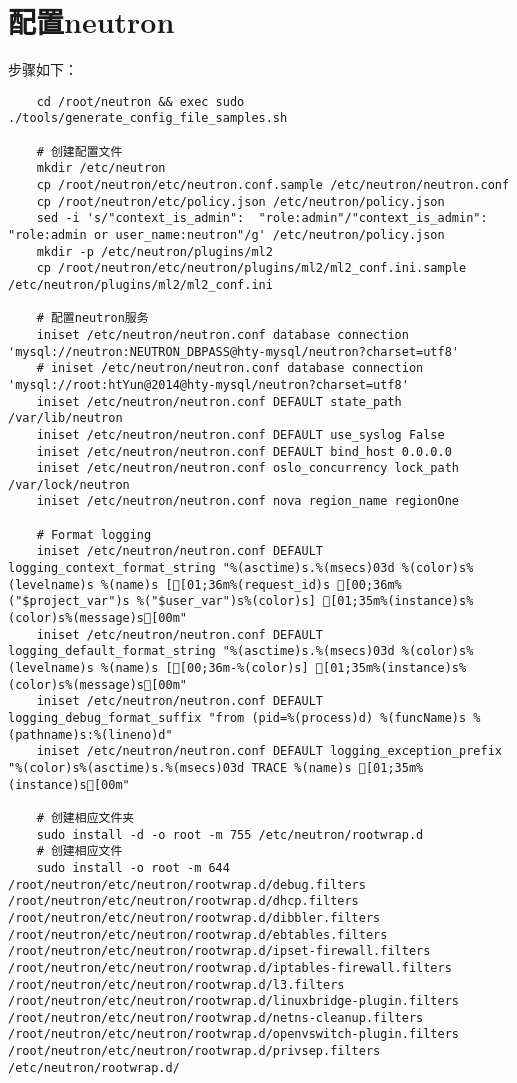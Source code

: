 \documentclass[a4paper,left=1.5cm,right=1.5cm,11pt]{article}
\begin{document}
\section{配置neutron}
	步骤如下：
	\begin{lstlisting}
	cd /root/neutron && exec sudo ./tools/generate_config_file_samples.sh
	
	# 创建配置文件
	mkdir /etc/neutron
	cp /root/neutron/etc/neutron.conf.sample /etc/neutron/neutron.conf
	cp /root/neutron/etc/policy.json /etc/neutron/policy.json
	sed -i 's/"context_is_admin":  "role:admin"/"context_is_admin":  "role:admin or user_name:neutron"/g' /etc/neutron/policy.json
	mkdir -p /etc/neutron/plugins/ml2
	cp /root/neutron/etc/neutron/plugins/ml2/ml2_conf.ini.sample /etc/neutron/plugins/ml2/ml2_conf.ini

	# 配置neutron服务
	iniset /etc/neutron/neutron.conf database connection 'mysql://neutron:NEUTRON_DBPASS@hty-mysql/neutron?charset=utf8'
	# iniset /etc/neutron/neutron.conf database connection 'mysql://root:htYun@2014@hty-mysql/neutron?charset=utf8'
	iniset /etc/neutron/neutron.conf DEFAULT state_path /var/lib/neutron
	iniset /etc/neutron/neutron.conf DEFAULT use_syslog False
	iniset /etc/neutron/neutron.conf DEFAULT bind_host 0.0.0.0
	iniset /etc/neutron/neutron.conf oslo_concurrency lock_path /var/lock/neutron
	iniset /etc/neutron/neutron.conf nova region_name regionOne

	# Format logging
	iniset /etc/neutron/neutron.conf DEFAULT logging_context_format_string "%(asctime)s.%(msecs)03d %(color)s%(levelname)s %(name)s [[01;36m%(request_id)s [00;36m%("$project_var")s %("$user_var")s%(color)s] [01;35m%(instance)s%(color)s%(message)s[00m"
	iniset /etc/neutron/neutron.conf DEFAULT logging_default_format_string "%(asctime)s.%(msecs)03d %(color)s%(levelname)s %(name)s [[00;36m-%(color)s] [01;35m%(instance)s%(color)s%(message)s[00m"
	iniset /etc/neutron/neutron.conf DEFAULT logging_debug_format_suffix "from (pid=%(process)d) %(funcName)s %(pathname)s:%(lineno)d"
	iniset /etc/neutron/neutron.conf DEFAULT logging_exception_prefix "%(color)s%(asctime)s.%(msecs)03d TRACE %(name)s [01;35m%(instance)s[00m"

	# 创建相应文件夹
	sudo install -d -o root -m 755 /etc/neutron/rootwrap.d
	# 创建相应文件
	sudo install -o root -m 644 /root/neutron/etc/neutron/rootwrap.d/debug.filters /root/neutron/etc/neutron/rootwrap.d/dhcp.filters /root/neutron/etc/neutron/rootwrap.d/dibbler.filters /root/neutron/etc/neutron/rootwrap.d/ebtables.filters /root/neutron/etc/neutron/rootwrap.d/ipset-firewall.filters /root/neutron/etc/neutron/rootwrap.d/iptables-firewall.filters /root/neutron/etc/neutron/rootwrap.d/l3.filters /root/neutron/etc/neutron/rootwrap.d/linuxbridge-plugin.filters /root/neutron/etc/neutron/rootwrap.d/netns-cleanup.filters /root/neutron/etc/neutron/rootwrap.d/openvswitch-plugin.filters /root/neutron/etc/neutron/rootwrap.d/privsep.filters /etc/neutron/rootwrap.d/


\end{lstlisting}
\end{document}
